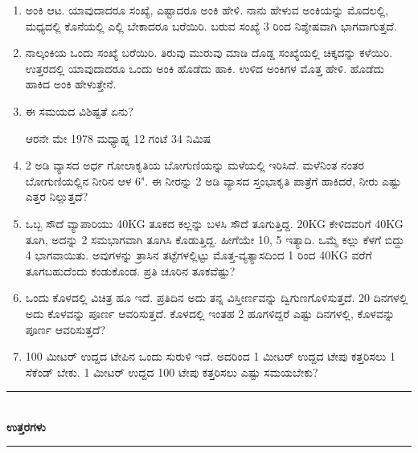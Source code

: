 \begin{enumerate}
{\bf ಆಶಯ :} ಒಬ್ಬ ಕವಾಡಿಗ (ಹಾಲು ಮಾರುವವನು). ಅವನಿಗೆ 9 ಹೆಂಡತಿಯರು. 81 ಎಮ್ಮೆಗಳನ್ನು ಕೊಂಡು ತರುತ್ತಾನೆ. 1ನೆ ಎಮ್ಮೆ 1 ಅಳತೆ, 2ನೆ ಎಮ್ಮೆ  2 ಅಳತೆ . . . .  81ನೆ ಎಮ್ಮೆ 81 ಅಳತೆ ಹಾಲು ಕೊಡುತ್ತದೆ. ಹೆಂಡತಿಯರಿಗೆ ರಾಸೂ ಸಮ, ಹಾಲೂ ಸಮ ಆಗುವಂತೆ ಹಂಚಿ. 

\item ಅಂಕಿ ಆಟ. ಯಾವುದಾದರೂ ಸಂಖ್ಯೆ, ಎಷ್ಟಾದರೂ ಅಂಕಿ ಹೇಳಿ. ನಾನು ಹೇಳುವ ಅಂಕಿಯನ್ನು ಮೊದಲಲ್ಲಿ, ಮಧ್ಯದಲ್ಲಿ ಕೊನೆಯಲ್ಲಿ ಎಲ್ಲಿ ಬೇಕಾದರೂ ಬರೆಯಿರಿ. ಬರುವ ಸಂಖ್ಯೆ 3 ರಿಂದ ನಿಶ್ಶೇಷವಾಗಿ ಭಾಗವಾಗುತ್ತದೆ.

\item ನಾಲ್ಕಂಕಿಯ ಒಂದು ಸಂಖ್ಯೆ ಬರೆಯಿರಿ. ತಿರುವು ಮುರುವು ಮಾಡಿ ದೊಡ್ಡ ಸಂಖ್ಯೆಯಲ್ಲಿ ಚಿಕ್ಕದನ್ನು ಕಳೆಯಿರಿ. ಉತ್ತರದಲ್ಲಿ ಯಾವುದಾದರೂ ಒಂದು ಅಂಕಿ ಹೊಡೆದು ಹಾಕಿ. ಉಳಿದ ಅಂಕಿಗಳ ಮೊತ್ತ ಹೇಳಿ. ಹೊಡೆದು ಹಾಕಿದ ಅಂಕಿ ಹೇಳುತ್ತೇನೆ.

\item ಈ ಸಮಯದ ವಿಶಿಷ್ಟತೆ ಏನು?

ಆರನೇ ಮೇ 1978 ಮಧ್ಯಾಹ್ನ 12 ಗಂಟೆ 34 ನಿಮಿಷ 

\item 2 ಅಡಿ ವ್ಯಾಸದ ಅರ್ಧ ಗೋಲಾಕೃತಿಯ ಬೋಗುಣಿಯನ್ನು ಮಳೆಯಲ್ಲಿ ಇರಿಸಿದೆ. ಮಳೆನಿಂತ ನಂತರ ಬೋಗು‌ಣಿಯಲ್ಲಿನ ನೀರಿನ ಆಳ 6". ಈ ನೀರನ್ನು 2 ಅಡಿ ವ್ಯಾಸದ ಸ್ತಂಭಾಕೃತಿ ಪಾತ್ರೆಗೆ ಹಾಕಿದರೆ, ನೀರು ಎಷ್ಟು ಎತ್ತರ ನಿಲ್ಲುತ್ತದೆ? 

\item ಒಬ್ಬ ಸೌದೆ ವ್ಯಾಪಾರಿಯು 40KG ತೂಕದ ಕಲ್ಲನ್ನು ಬಳಸಿ ಸೌದೆ ತೂಗುತ್ತಿದ್ದ. 20KG ಕೇಳಿದವರಿಗೆ 40KG ತೂಗಿ, ಅದನ್ನು 2 ಸಮಭಾಗವಾಗಿ ತೂಗಿಸಿ ಕೊಡುತ್ತಿದ್ದ. ಹೀಗೆಯೇ 10, 5 ಇತ್ಯಾದಿ. ಒಮ್ಮೆ ಕಲ್ಲು ಕೆಳಗೆ ಬಿದ್ದು 4 ಭಾಗವಾಯಿತು. ಅವುಗಳನ್ನು ತ್ರಾಸಿನ ತಟ್ಟೆಗಳಲ್ಲಿಟ್ಟು ಮೊತ್ತ-ವ್ಯತ್ಯಾಸದಿಂದ 1 ರಿಂದ 40KG ವರೆಗೆ ತೂಗಬಹುದೆಂದು ಕಂಡುಕೊಂಡ. ಪ್ರತಿ ಚೂರಿನ ತೂಕವೆಷ್ಟು? 

\item ಒಂದು ಕೊಳದಲ್ಲಿ ವಿಚಿತ್ರ ಹೂ ಇದೆ. ಪ್ರತಿದಿನ ಅದು ತನ್ನ ವಿಸ್ತೀರ್ಣವನ್ನು ದ್ವಿಗುಣಗೊಳಿಸುತ್ತದೆ. 20 ದಿನಗಳಲ್ಲಿ ಅದು ಕೊಳವನ್ನು ಪೂರ್ಣ ಆವರಿಸುತ್ತದೆ. ಕೊಳದಲ್ಲಿ ಇಂತಹ 2 ಹೂಗಳಿದ್ದರೆ ಎಷ್ಟು ದಿನಗಳಲ್ಲಿ, ಕೊಳವನ್ನು ಪೂರ್ಣ ಆವರಿಸುತ್ತದೆ?

\item 100 ಮೀಟರ್ ಉದ್ದದ ಟೇಪಿನ ಒಂದು ಸುರುಳಿ ಇದೆ. ಅದರಿಂದ 1 ಮೀಟರ್ ಉದ್ದದ ಟೇಪು ಕತ್ತರಿಸಲು 1 ಸೆಕೆಂಡ್ ಬೇಕು. 1 ಮೀಟರ್ ಉದ್ದದ 100 ಟೇಪು ಕತ್ತರಿಸಲು ಎಷ್ಟು ಸಮಯಬೇಕು? 
\end{enumerate}

\eject

\begin{center}
\rule{5cm}{1pt}\\[3pt]
{\Large\bfseries ಉತ್ತರಗಳು}\\[-0.1cm]
\rule{5cm}{1pt}
\end{center}

